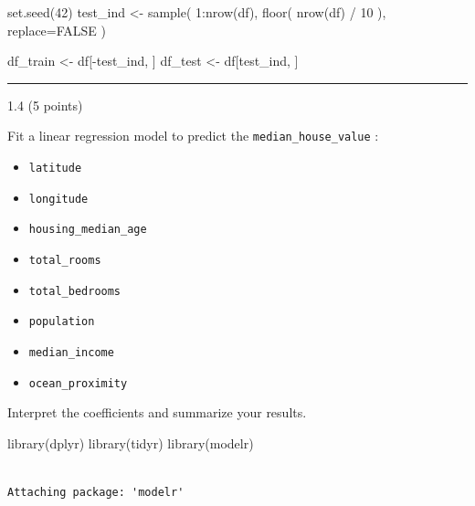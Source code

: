 \documentclass[
  letterpaper,
  DIV=11,
  numbers=noendperiod]{scrartcl}
\newenvironment{Shaded}{\begin{snugshade}}{\end{snugshade}}
\newcommand{\AttributeTok}[1]{\textcolor[rgb]{0.40,0.45,0.13}{#1}}
\newcommand{\ConstantTok}[1]{\textcolor[rgb]{0.56,0.35,0.01}{#1}}
\newcommand{\DecValTok}[1]{\textcolor[rgb]{0.68,0.00,0.00}{#1}}
\newcommand{\FunctionTok}[1]{\textcolor[rgb]{0.28,0.35,0.67}{#1}}
\newcommand{\NormalTok}[1]{\textcolor[rgb]{0.00,0.23,0.31}{#1}}
\newcommand{\OtherTok}[1]{\textcolor[rgb]{0.00,0.23,0.31}{#1}}
\newcommand{\SpecialCharTok}[1]{\textcolor[rgb]{0.37,0.37,0.37}{#1}}
\providecommand{\tightlist}{%
  \setlength{\itemsep}{0pt}\setlength{\parskip}{0pt}}\usepackage{longtable,booktabs,array}
\begin{document}
\begin{Shaded}
\begin{Highlighting}[]
\FunctionTok{set.seed}\NormalTok{(}\DecValTok{42}\NormalTok{)}
\NormalTok{test\_ind }\OtherTok{\textless{}{-}} \FunctionTok{sample}\NormalTok{(}
  \DecValTok{1}\SpecialCharTok{:}\FunctionTok{nrow}\NormalTok{(df),}
  \FunctionTok{floor}\NormalTok{( }\FunctionTok{nrow}\NormalTok{(df) }\SpecialCharTok{/} \DecValTok{10}\NormalTok{ ),}
  \AttributeTok{replace=}\ConstantTok{FALSE}
\NormalTok{)}

\NormalTok{df\_train }\OtherTok{\textless{}{-}}\NormalTok{ df[}\SpecialCharTok{{-}}\NormalTok{test\_ind, ]}
\NormalTok{df\_test }\OtherTok{\textless{}{-}}\NormalTok{ df[test\_ind, ]}
\end{Highlighting}
\end{Shaded}

\begin{center}\rule{0.5\linewidth}{0.5pt}\end{center}

1.4 (5 points)

Fit a linear regression model to predict the
\texttt{median\_house\_value} :

\begin{itemize}
\tightlist
\item
  \texttt{latitude}
\item
  \texttt{longitude}
\item
  \texttt{housing\_median\_age}
\item
  \texttt{total\_rooms}
\item
  \texttt{total\_bedrooms}
\item
  \texttt{population}
\item
  \texttt{median\_income}
\item
  \texttt{ocean\_proximity}
\end{itemize}

Interpret the coefficients and summarize your results.

\begin{Shaded}
\begin{Highlighting}[]
\FunctionTok{library}\NormalTok{(dplyr)}
\FunctionTok{library}\NormalTok{(tidyr)}
\FunctionTok{library}\NormalTok{(modelr)}
\end{Highlighting}
\end{Shaded}

\begin{verbatim}

Attaching package: 'modelr'
\end{verbatim}
\end{document}

